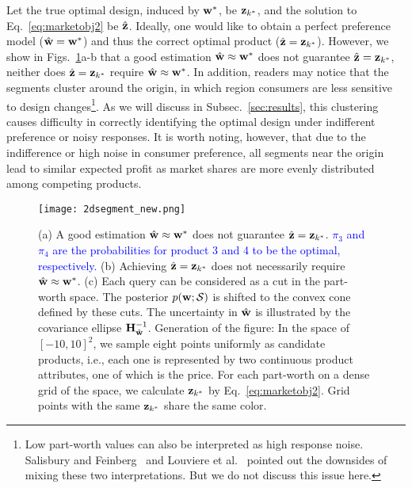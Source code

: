 \documentclass[onecolumn,11pt]{article}
\newcommand{\highlight}[1]{{\textcolor{blue}{{#1}}}}
\newcommand{\highlight}[1]{{{#1}}}
\begin{document}
Let the true optimal design, induced by ${\bf w}^*$, be ${\bf z}_{k^*}$, and the solution to Eq.~\eqref{eq:marketobj2} be $\hat{\bf z}$. Ideally, one would like to obtain a perfect preference model ($\hat{\bf w} = {\bf w}^*$) and thus the correct optimal product ($\hat{\bf z} = {\bf z}_{k^*}$). However, we show in Figs.~\ref{fig:2dsegment}a-b that a good estimation $\hat{\bf w} \approx {\bf w}^*$ does not guarantee $\hat{\bf z} = {\bf z}_{k^*}$, neither does $\hat{\bf z} = {\bf z}_{k^*}$ require $\hat{\bf w} \approx {\bf w}^*$. In addition, readers may notice that the segments cluster around the origin, in which region consumers are less sensitive to design changes\footnote{Low part-worth values can also be interpreted as high response noise. Salisbury and Feinberg~\cite{salisbury2010alleviating} and Louviere et al.~\cite{louviere2002dissecting} pointed out the downsides of mixing these two interpretations. But we do not discuss this issue here.}. As we will discuss in Subsec.~\ref{sec:results}, this clustering causes difficulty in correctly identifying the optimal design under indifferent preference or noisy responses. It is worth noting, however, that due to the indifference or high noise in consumer preference, all segments near the origin lead to similar expected profit as market shares are more evenly distributed among competing products.

\begin{figure}
\centering
\texttt{[image: 2dsegment\_new.png]}
\caption{(a) A good estimation $\hat{\bf w} \approx {\bf w}^*$ does not guarantee $\hat{\bf z} = {\bf z}_{k^*}$. \highlight{$\pi_3$ and $\pi_4$ are the probabilities for product 3 and 4 to be the optimal, respectively.} (b) Achieving $\hat{\bf z} = {\bf z}_{k^*}$ does not necessarily require $\hat{\bf w} \approx {\bf w}^*$. (c) Each query can be considered as a cut in the part-worth space. The posterior $p({\bf w};\mathcal{S})$ is shifted to the convex cone defined by these cuts. The uncertainty in $\hat{\bf w}$ is illustrated by the covariance ellipse ${\bf H}_{\hat{\bf w}}^{-1}$. Generation of the figure: In the space of $[-10,10]^2$, we sample eight points uniformly as candidate products, i.e., each one is represented by two continuous product attributes, one of which is the price. For each part-worth on a dense grid of the space, we calculate ${\bf z}_{k^*}$ by Eq.~\eqref{eq:marketobj2}. Grid points with the same ${\bf z}_{k^*}$ share the same color.} 
\label{fig:2dsegment}
\end{figure}
\end{document}
